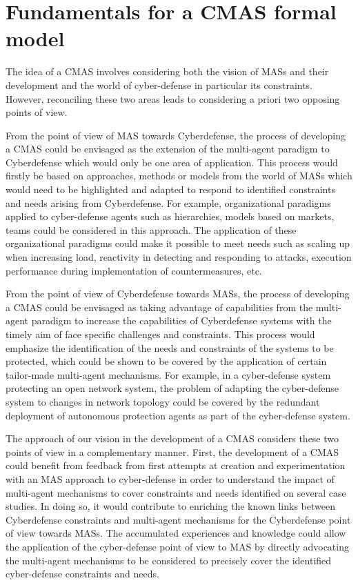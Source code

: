 \documentclass[conference]{IEEEtran}
\begin{document}
\section{Fundamentals for a CMAS formal model}

The idea of a CMAS involves considering both the vision of MASs and their development and the world of cyber-defense in particular its constraints. However, reconciling these two areas leads to considering a priori two opposing points of view.

From the point of view of MAS towards Cyberdefense, the process of developing a CMAS could be envisaged as the extension of the multi-agent paradigm to Cyberdefense which would only be one area of application. This process would firstly be based on approaches, methods or models from the world of MASs which would need to be highlighted and adapted to respond to identified constraints and needs arising from Cyberdefense. For example, organizational paradigms applied to cyber-defense agents such as hierarchies, models based on markets, teams could be considered in this approach. The application of these organizational paradigms could make it possible to meet needs such as scaling up when increasing load, reactivity in detecting and responding to attacks, execution performance during implementation of countermeasures, etc.

From the point of view of Cyberdefense towards MASs, the process of developing a CMAS could be envisaged as taking advantage of capabilities from the multi-agent paradigm to increase the capabilities of Cyberdefense systems with the timely aim of face specific challenges and constraints. This process would emphasize the identification of the needs and constraints of the systems to be protected, which could be shown to be covered by the application of certain tailor-made multi-agent mechanisms. For example, in a cyber-defense system protecting an open network system, the problem of adapting the cyber-defense system to changes in network topology could be covered by the redundant deployment of autonomous protection agents as part of the cyber-defense system.

The approach of our vision in the development of a CMAS considers these two points of view in a complementary manner. First, the development of a CMAS could benefit from feedback from first attempts at creation and experimentation with an MAS approach to cyber-defense in order to understand the impact of multi-agent mechanisms to cover constraints and needs identified on several case studies. In doing so, it would contribute to enriching the known links between Cyberdefense constraints and multi-agent mechanisms for the Cyberdefense point of view towards MASs. The accumulated experiences and knowledge could allow the application of the cyber-defense point of view to MAS by directly advocating the multi-agent mechanisms to be considered to precisely cover the identified cyber-defense constraints and needs.
\end{document}
